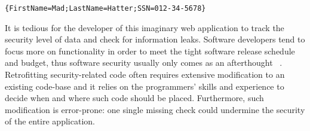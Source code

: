 \begin{lstlisting}[numbers=none,xleftmargin=0.15\textwidth]
{FirstName=Mad;LastName=Hatter;SSN=012-34-5678}
\end{lstlisting}

\noindent It is tedious for the developer of this imaginary web application to track the
security level of data and check for information leaks. Software developers tend
to focus more on functionality in order to meet the tight software release
schedule and budget, thus software security usually only comes as an
afterthought
~\parencite{assal2018security,sharma2017aspects,steward2012software}.
Retrofitting security-related code often requires extensive modification to an
existing code-base and it relies on the programmers' skills and experience to
decide when and where such code should be placed. Furthermore, such modification
is error-prone: one single missing check could undermine the security of the
entire application.

\begin{figure*}[tbp]
  \small
  \center
{}
\caption{The parse tree generated from the example user input.
  All terminals are represented as labeled values:
  the {\color{red} red} ones, such as the digits of SSN,
  are of high-security, while the {\color{green} green} ones, such as the keys
  of the record and first name / last name, are of low-security.}
\label{fig:parsetree}
\end{figure*}


